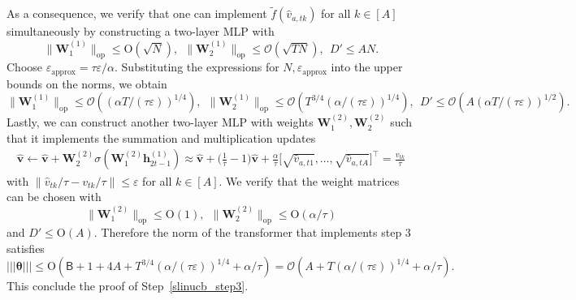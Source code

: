 \documentclass[10pt]{article}
\renewcommand{\hat}{\widehat}
\newcommand{\eps}{\varepsilon}
\newcommand{\lops}[1]{\|{#1}\|_{\mathrm{op}}}
\renewcommand{\cO}{\mathcal{O}}
\newcommand{\<}{\left\langle}
\renewcommand{\>}{\right\rangle}
\newcommand{\nrmp}[1]{{\left|\!\left|\!\left|{#1}\right|\!\right|\!\right|}}
\newcommand{\appr}{{\mathrm{approx}}}
\newcommand{\temp}{{\tau}}
\newcommand{\cwid}{{\alpha}}
\newcommand{\hidden}{{D'}}
\newcommand{\tfthres}{{\mathsf{B}}}
\newcommand{\conO}{{\mathrm{O}}}
\def\bW{{\mathbf W}}
\def\btheta{{\boldsymbol \theta}}
\def\bh{{\mathbf h}}
\def\bv{{\mathbf v}}
\begin{document}
 As a consequence, we verify that one can implement $\tilde f(\hat v_{a,tk})$ for all $k\in[A]$ simultaneously  by constructing a two-layer MLP with $$\lops{\bW_1^{(1)}}\leq \conO(\sqrt{N}),~~\lops{\bW_2^{(1)}}\leq \cO(\sqrt{TN}),~~\hidden\leq AN.$$
 Choose $\eps_{\appr}=\temp\eps/\alpha$. Substituting the expressions for $N,\eps_\appr$ into the upper bounds on the norms, we obtain
 $$\lops{\bW_1^{(1)}}\leq \cO(({\alpha T/(\temp\eps)})^{1/4}),~~\lops{\bW_2^{(1)}}\leq \cO(T^{3/4}({\alpha/(\temp\eps)})^{1/4}),~~\hidden\leq \cO(A({\alpha T/(\temp\eps)})^{1/2}).$$
 Lastly, we can construct another two-layer MLP with weights $\bW^{(2)}_1,\bW^{(2)}_2$ such that it implements the summation and multiplication updates
 \begin{align*}
 \hat\bv\leftarrow\hat\bv+\bW^{(2)}_2\sigma(\bW^{(2)}_1\bh_{2t-1}^{(1)})\approx\hat\bv+\Big(\frac1\temp-1\Big)\hat\bv+\frac\alpha\temp\Big[\sqrt{ \hat v_{a,t1}},\ldots,\sqrt{ \hat v_{a,tA}}\Big]^\top=\frac{\hat v_{tk}}{\temp}
 \end{align*}
with $\|\hat v_{tk}/\temp-v_{tk}/\temp\|\leq \eps$ for all $k\in[A]$. We verify that the weight matrices can be chosen with
  $$
 \lops{\bW^{(2)}_1}\leq \conO(1),~~ \lops{\bW^{(2)}_2}\leq \conO(\alpha/\temp)
 $$ and $\hidden\leq \conO(A)$.
 Therefore the norm of the transformer that implements step 3 satisfies $$
 \nrmp{\btheta}\leq \conO(\tfthres+1+4A+T^{3/4}({\alpha/(\temp\eps)})^{1/4}+\cwid/\temp)=
 \cO(A+T({\alpha/(\temp\eps)})^{1/4}+\alpha/\temp).$$  This conclude the proof of Step~\ref{slinucb_step3}.
\end{document}
